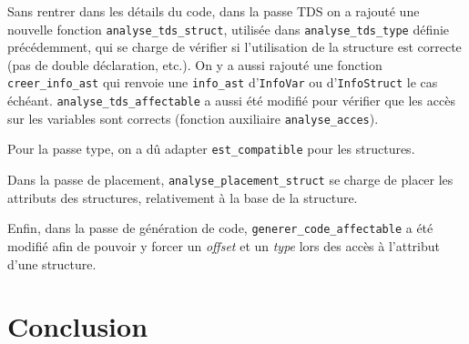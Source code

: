 \documentclass[headings=standardclasses,parskip=half]{scrartcl}
\begin{document}
Sans rentrer dans les détails du code, dans la passe TDS on a rajouté
une nouvelle fonction \texttt{analyse\_tds\_struct}, utilisée dans
\texttt{analyse\_tds\_type} définie précédemment, qui se charge de
vérifier si l'utilisation de la structure est correcte (pas de double
déclaration, etc.). On y a aussi rajouté une fonction
\texttt{creer\_info\_ast} qui renvoie une \texttt{info\_ast}
d'\texttt{InfoVar} ou d'\texttt{InfoStruct} le cas échéant.
\texttt{analyse\_tds\_affectable} a aussi été modifié pour vérifier
que les accès sur les variables sont corrects (fonction auxiliaire
\texttt{analyse\_acces}).

Pour la passe type, on a dû adapter \texttt{est\_compatible}
pour les structures.

Dans la passe de placement, \texttt{analyse\_placement\_struct} se
charge de placer les attributs des structures, relativement à la base
de la structure.

Enfin, dans la passe de génération de code,
\texttt{generer\_code\_affectable} a été modifié afin de pouvoir
y forcer un \textit{offset} et un \textit{type} lors des accès
à l'attribut d'une structure.

\section{Conclusion}
\end{document}

